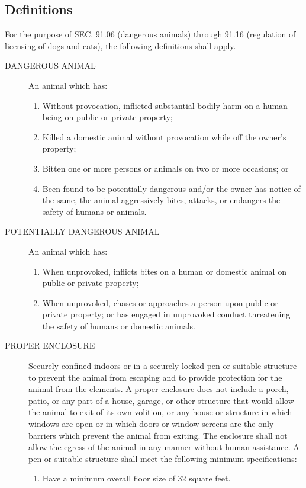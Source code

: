 \documentclass[code.tex]{subfiles}
\begin{document}
\subsection{Definitions}
For the purpose of SEC. 91.06 (dangerous animals) through 91.16 (regulation of licensing of dogs and cats), the following definitions shall apply.
\begin{description}
\item[DANGEROUS ANIMAL] An animal which has:
\begin{enumerate}
\item Without provocation, inflicted substantial bodily harm on a human being on public or private property;
\item Killed a domestic animal without provocation while off the owner’s property;
\item Bitten one or more persons or animals on two or more occasions; or
\item Been found to be potentially dangerous and/or the owner has notice of the same, the animal aggressively bites, attacks, or endangers the safety of humans or animals.
\end{enumerate}
\item[POTENTIALLY DANGEROUS ANIMAL]  An animal which has:
\begin{enumerate}
\item When unprovoked, inflicts bites on a human or domestic animal on public or private property;
\item When unprovoked, chases or approaches a person upon public or private property; or has engaged in unprovoked conduct threatening the safety of humans or domestic animals.
\end{enumerate}
\item[PROPER ENCLOSURE]  Securely confined indoors or in a securely locked pen or suitable structure to prevent the animal from escaping and to provide protection for the animal from the elements.  A proper enclosure does not include a porch, patio, or any part of a house, garage, or other structure that would allow the animal to exit of its own volition, or any house or structure in which windows are open or in which doors or window screens are the only barriers which prevent the animal from exiting.  The enclosure shall not allow the egress of the animal in any manner without human assistance.  A pen or suitable structure shall meet the following minimum specifications:
\begin{enumerate}
\item Have a minimum overall floor size of 32 square feet.

\end{enumerate}
\end{description}
\end{document}
